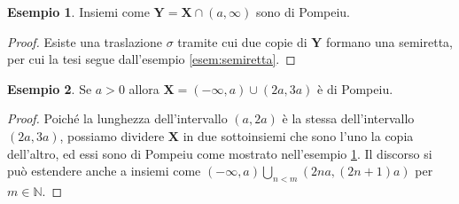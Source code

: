 \documentclass[12pt]{article}
\newcommand\ins[1]{\mathbf #1}
\newcommand\pom{di Pompeiu}
\theoremstyle{definition}
\newtheorem{esem}{Esempio}
\begin{document}
\begin{esem}\label{es:semiretta-tratti}
Insiemi come $\ins Y=\ins X\cap(a,\infty)$ sono \pom{}.
\end{esem}
\begin{proof}
Esiste una traslazione $\sigma$ tramite cui due copie di $\ins Y$ formano una semiretta, per cui la tesi segue dall'esempio \ref{esem:semiretta}.
\end{proof}

\begin{esem}Se $a>0$ allora $\ins X=(-\infty,a)\cup(2a,3a)$ è \pom{}.
\end{esem}
\begin{proof}Poiché la lunghezza dell'intervallo $(a,2a)$ è la stessa dell'intervallo $(2a,3a)$, possiamo dividere $\ins X$ in due sottoinsiemi che sono l'uno la copia dell'altro, ed essi sono \pom{} come mostrato nell'esempio \ref{es:semiretta-tratti}. Il discorso si può estendere anche a insiemi come $(-\infty,a)\bigcup_{n<m}(2na,(2n+1)a)$ per $m\in\mathbb N$.
\end{proof}
\end{document}
